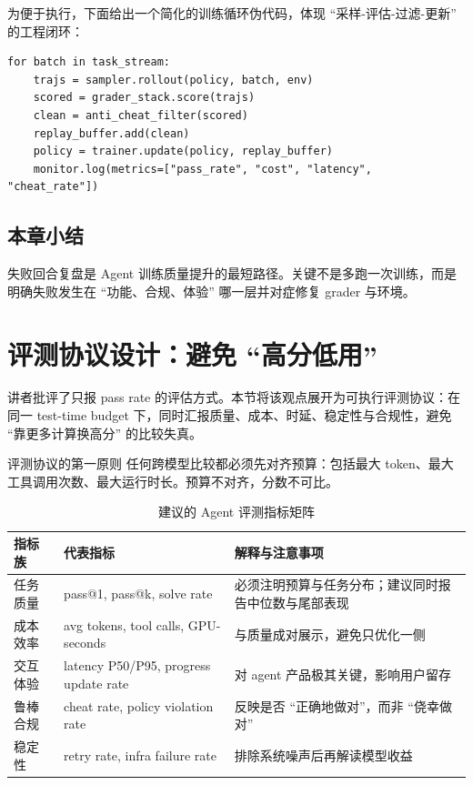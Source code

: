 \documentclass[a4paper]{article}
\begin{document}
为便于执行，下面给出一个简化的训练循环伪代码，体现 ``采样-评估-过滤-更新'' 的工程闭环：

\begin{lstlisting}[caption={Agent RL 训练循环（简化版）}]
for batch in task_stream:
    trajs = sampler.rollout(policy, batch, env)
    scored = grader_stack.score(trajs)
    clean = anti_cheat_filter(scored)
    replay_buffer.add(clean)
    policy = trainer.update(policy, replay_buffer)
    monitor.log(metrics=["pass_rate", "cost", "latency", "cheat_rate"])
\end{lstlisting}

\subsection{本章小结}
失败回合复盘是 Agent 训练质量提升的最短路径。关键不是多跑一次训练，而是明确失败发生在 ``功能、合规、体验'' 哪一层并对症修复 grader 与环境。

\section{评测协议设计：避免 ``高分低用''}

讲者批评了只报 pass rate 的评估方式。本节将该观点展开为可执行评测协议：在同一 test-time budget 下，同时汇报质量、成本、时延、稳定性与合规性，避免 ``靠更多计算换高分'' 的比较失真。

\begin{importantbox}{评测协议的第一原则}
任何跨模型比较都必须先对齐预算：包括最大 token、最大工具调用次数、最大运行时长。预算不对齐，分数不可比。
\end{importantbox}

\begin{table}[H]
\centering
\begin{tabular}{p{2.3cm}p{3.0cm}p{5.0cm}}
\toprule
\textbf{指标族} & \textbf{代表指标} & \textbf{解释与注意事项} \\
\midrule
任务质量 & pass@1, pass@k, solve rate & 必须注明预算与任务分布；建议同时报告中位数与尾部表现 \\
成本效率 & avg tokens, tool calls, GPU-seconds & 与质量成对展示，避免只优化一侧 \\
交互体验 & latency P50/P95, progress update rate & 对 agent 产品极其关键，影响用户留存 \\
鲁棒合规 & cheat rate, policy violation rate & 反映是否 ``正确地做对''，而非 ``侥幸做对'' \\
稳定性 & retry rate, infra failure rate & 排除系统噪声后再解读模型收益 \\
\bottomrule
\end{tabular}
\caption{建议的 Agent 评测指标矩阵}
\end{table}
\end{document}
